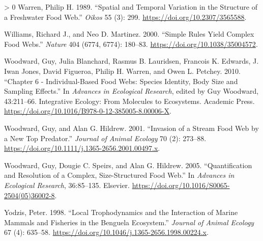\documentclass{article}
\newlength{\cslhangindent}
\newenvironment{CSLReferences}[3] %
 {%
  \setlength{\parindent}{0pt}
  \ifodd #1 \everypar{\setlength{\hangindent}{\cslhangindent}}\ignorespaces\fi
  \ifnum #2 > 0
  \setlength{\parskip}{#2\baselineskip}
  \fi
 }%
 {}
\begin{document}
\begin{CSLReferences}{1}{0}
\leavevmode\hypertarget{ref-warrenSpatialTemporalVariation1989}{}%
Warren, Philip H. 1989. {``Spatial and {Temporal Variation} in the
{Structure} of a {Freshwater Food Web}.''} \emph{Oikos} 55 (3): 299.
\url{https://doi.org/10.2307/3565588}.

\leavevmode\hypertarget{ref-williamsSimpleRulesYield2000}{}%
Williams, Richard J., and Neo D. Martinez. 2000. {``Simple Rules Yield
Complex Food Webs.''} \emph{Nature} 404 (6774, 6774): 180--83.
\url{https://doi.org/10.1038/35004572}.

\leavevmode\hypertarget{ref-woodwardChapterIndividualBasedFood2010}{}%
Woodward, Guy, Julia Blanchard, Rasmus B. Lauridsen, Francois K.
Edwards, J. Iwan Jones, David Figueroa, Philip H. Warren, and Owen L.
Petchey. 2010. {``Chapter 6 - {Individual}-{Based Food Webs}: {Species
Identity}, {Body Size} and {Sampling Effects}.''} In \emph{Advances in
{Ecological Research}}, edited by Guy Woodward, 43:211--66. Integrative
{Ecology}: {From Molecules} to {Ecosystems}. {Academic Press}.
\url{https://doi.org/10.1016/B978-0-12-385005-8.00006-X}.

\leavevmode\hypertarget{ref-woodwardInvasionStreamFood2001}{}%
Woodward, Guy, and Alan G. Hildrew. 2001. {``Invasion of a Stream Food
Web by a New Top Predator.''} \emph{Journal of Animal Ecology} 70 (2):
273--88. \url{https://doi.org/10.1111/j.1365-2656.2001.00497.x}.

\leavevmode\hypertarget{ref-woodwardQuantificationResolutionComplex2005}{}%
Woodward, Guy, Dougie C. Speirs, and Alan G. Hildrew. 2005.
{``Quantification and {Resolution} of a {Complex}, {Size}-{Structured
Food Web}.''} In \emph{Advances in {Ecological Research}}, 36:85--135.
{Elsevier}. \url{https://doi.org/10.1016/S0065-2504(05)36002-8}.

\leavevmode\hypertarget{ref-yodzisLocalTrophodynamicsInteraction1998}{}%
Yodzis, Peter. 1998. {``Local Trophodynamics and the Interaction of
Marine Mammals and Fisheries in the {Benguela} Ecosystem.''}
\emph{Journal of Animal Ecology} 67 (4): 635--58.
\url{https://doi.org/10.1046/j.1365-2656.1998.00224.x}.

\end{CSLReferences}



\end{document}
